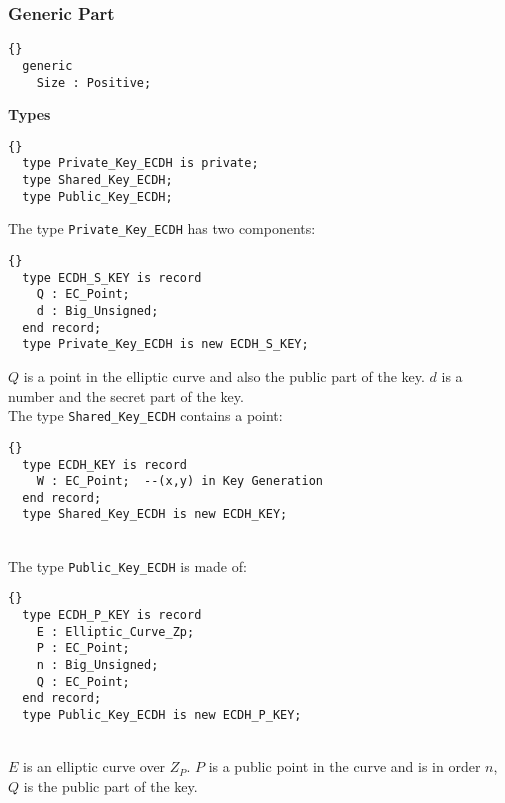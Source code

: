 \subsubsection*{Generic Part}
\begin{lstlisting}{}
  generic
    Size : Positive;
\end{lstlisting}
\textbf{Types}
\begin{lstlisting}{}
  type Private_Key_ECDH is private;
  type Shared_Key_ECDH;
  type Public_Key_ECDH;
\end{lstlisting}
The type \texttt{Private\_Key\_ECDH} has two components:
\begin{lstlisting}{}
  type ECDH_S_KEY is record
    Q : EC_Point; 
    d : Big_Unsigned;
  end record;
  type Private_Key_ECDH is new ECDH_S_KEY;
\end{lstlisting}
$Q$ is a point in the elliptic curve and also the public part of the key. $d$ is a number and the secret part of the key.\\
The type \texttt{Shared\_Key\_ECDH} contains a point:
\begin{lstlisting}{}
  type ECDH_KEY is record
    W : EC_Point;  --(x,y) in Key Generation
  end record;
  type Shared_Key_ECDH is new ECDH_KEY;
\end{lstlisting}\\
The type \texttt{Public\_Key\_ECDH} is made of:
\begin{lstlisting}{}
  type ECDH_P_KEY is record
    E : Elliptic_Curve_Zp;
    P : EC_Point;
    n : Big_Unsigned;
    Q : EC_Point;
  end record;
  type Public_Key_ECDH is new ECDH_P_KEY;
\end{lstlisting}\\
$E$ is an elliptic curve over $Z_P$. $P$ is a public point in the curve and is in order $n$, $Q$ is the public part of the key.\\
